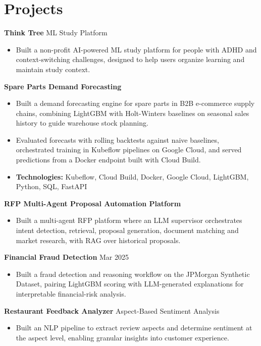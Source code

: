 \documentclass[10pt,a4paper]{article}
\begin{document}
\section{Projects}
\textbf{Think Tree} \textbar{} ML Study Platform\par
\begin{itemize}
  \item Built a non-profit AI-powered ML study platform for people with ADHD and context-switching challenges, designed to help users organize learning and maintain study context.
\end{itemize}
\textbf{Spare Parts Demand Forecasting}\par
\begin{itemize}
  \item Built a demand forecasting engine for spare parts in B2B e-commerce supply chains, combining LightGBM with Holt-Winters baselines on seasonal sales history to guide warehouse stock planning.
  \item Evaluated forecasts with rolling backtests against naive baselines, orchestrated training in Kubeflow pipelines on Google Cloud, and served predictions from a Docker endpoint built with Cloud Build.
  \item \textbf{Technologies:} Kubeflow, Cloud Build, Docker, Google Cloud, LightGBM, Python, SQL, FastAPI
\end{itemize}
\textbf{RFP Multi-Agent Proposal Automation Platform}\par
\begin{itemize}
  \item Built a multi-agent RFP platform where an LLM supervisor orchestrates intent detection, retrieval, proposal generation, document matching and market research, with RAG over historical proposals.
\end{itemize}
\textbf{Financial Fraud Detection} \textbar{} Mar 2025\par
\begin{itemize}
  \item Built a fraud detection and reasoning workflow on the JPMorgan Synthetic Dataset, pairing LightGBM scoring with LLM-generated explanations for interpretable financial-risk analysis.
\end{itemize}
\textbf{Restaurant Feedback Analyzer} \textbar{} Aspect-Based Sentiment Analysis\par
\begin{itemize}
  \item Built an NLP pipeline to extract review aspects and determine sentiment at the aspect level, enabling granular insights into customer experience.
\end{itemize}
\end{document}
